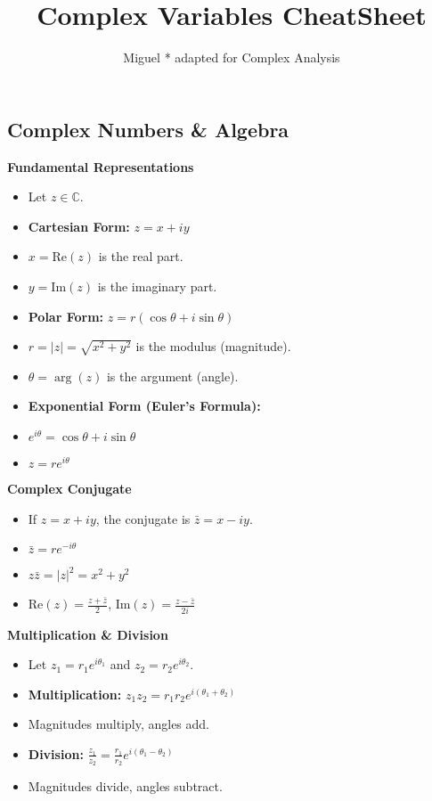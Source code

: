 \documentclass{../cheatsheet}
\title{Complex Variables CheatSheet}
\author{Miguel * adapted for Complex Analysis}
\begin{document}
\begin{multicols}{3}
\section{Complex Numbers & Algebra}

\textbf{Fundamental Representations}
\begin{itemize} 
    \item Let $z \in \mathbb{C}$.
    \item \textbf{Cartesian Form:} $z = x + iy$
        \item $x = \text{Re}(z)$ is the real part.
        \item $y = \text{Im}(z)$ is the imaginary part.
    \item \textbf{Polar Form:} $z = r(\cos\theta + i\sin\theta)$
        \item $r = |z| = \sqrt{x^2 + y^2}$ is the modulus (magnitude).
        \item $\theta = \arg(z)$ is the argument (angle).
    \item \textbf{Exponential Form (Euler's Formula):}
        \item $e^{i\theta} = \cos\theta + i\sin\theta$
        \item $z = re^{i\theta}$
\end{itemize}

\textbf{Complex Conjugate}
\begin{itemize}
    \item If $z = x+iy$, the conjugate is $\bar{z} = x-iy$.
    \item $\bar{z} = re^{-i\theta}$
    \item $z\bar{z} = |z|^2 = x^2+y^2$
    \item $\text{Re}(z) = \frac{z+\bar{z}}{2}$, $\text{Im}(z) = \frac{z-\bar{z}}{2i}$
\end{itemize}

\textbf{Multiplication \& Division}
\begin{itemize}
    \item Let $z_1 = r_1 e^{i\theta_1}$ and $z_2 = r_2 e^{i\theta_2}$.
    \item \textbf{Multiplication:} $z_1z_2 = r_1r_2e^{i(\theta_1+\theta_2)}$
        \item Magnitudes multiply, angles add.
    \item \textbf{Division:} $\frac{z_1}{z_2} = \frac{r_1}{r_2}e^{i(\theta_1-\theta_2)}$
        \item Magnitudes divide, angles subtract.
\end{itemize}


\end{multicols}
\end{document}
